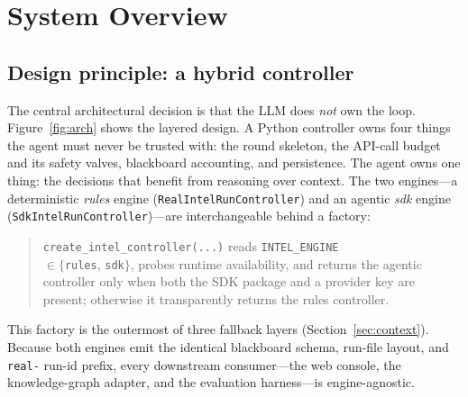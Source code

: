 \documentclass[conference]{IEEEtran}
\newcommand{\code}[1]{\texttt{\small #1}}
\begin{document}
\section{System Overview}
\label{sec:overview}

\subsection{Design principle: a hybrid controller}

The central architectural decision is that the LLM does \emph{not} own the loop. Figure~\ref{fig:arch} shows the layered design. A Python controller owns four things the agent must never be trusted with: the round skeleton, the API-call budget and its safety valves, blackboard accounting, and persistence. The agent owns one thing: the decisions that benefit from reasoning over context. The two engines---a deterministic \emph{rules} engine (\code{RealIntelRunController}) and an agentic \emph{sdk} engine (\code{SdkIntelRunController})---are interchangeable behind a factory:

\begin{quote}
\code{create\_intel\_controller(...)} reads \code{INTEL\_ENGINE}\\ $\in\{$\code{rules}, \code{sdk}$\}$, probes runtime availability, and returns the agentic controller only when both the SDK package and a provider key are present; otherwise it transparently returns the rules controller.
\end{quote}

This factory is the outermost of three fallback layers (Section~\ref{sec:context}). Because both engines emit the identical blackboard schema, run-file layout, and \code{real-} run-id prefix, every downstream consumer---the web console, the knowledge-graph adapter, and the evaluation harness---is engine-agnostic.
\end{document}
